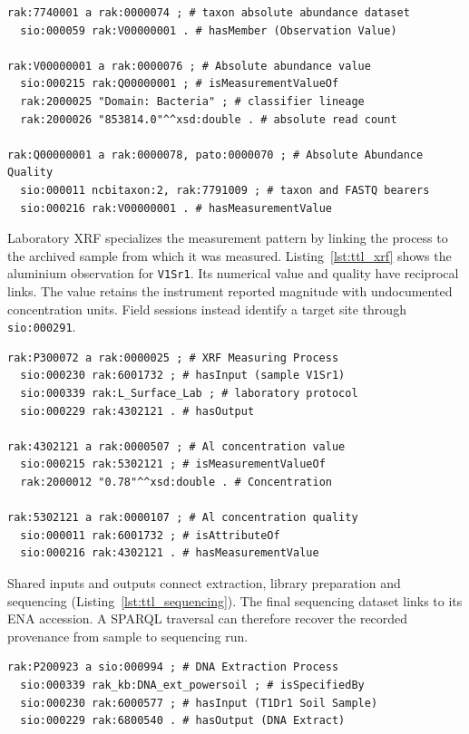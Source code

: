 \begin{revision}
\begin{lstlisting}[caption={Turtle representation of taxonomic abundance formalized from a feature table.}, label={lst:ttl_tax}, basicstyle=\ttfamily\scriptsize, frame=single]
rak:7740001 a rak:0000074 ; # taxon absolute abundance dataset
  sio:000059 rak:V00000001 . # hasMember (Observation Value)

rak:V00000001 a rak:0000076 ; # Absolute abundance value
  sio:000215 rak:Q00000001 ; # isMeasurementValueOf
  rak:2000025 "Domain: Bacteria" ; # classifier lineage
  rak:2000026 "853814.0"^^xsd:double . # absolute read count

rak:Q00000001 a rak:0000078, pato:0000070 ; # Absolute Abundance Quality
  sio:000011 ncbitaxon:2, rak:7791009 ; # taxon and FASTQ bearers
  sio:000216 rak:V00000001 . # hasMeasurementValue
\end{lstlisting}

Laboratory XRF specializes the measurement pattern by linking the
process to the archived sample from which it was measured. Listing~\ref{lst:ttl_xrf} shows the
aluminium observation for \texttt{V1Sr1}. Its numerical value and
quality have reciprocal links. The value retains the instrument reported
magnitude with undocumented concentration units. Field sessions instead
identify a target site through \texttt{sio:000291}.

\begin{lstlisting}[caption={Turtle representation of an XRF geochemistry measurement.}, label={lst:ttl_xrf}, basicstyle=\ttfamily\scriptsize, frame=single]
rak:P300072 a rak:0000025 ; # XRF Measuring Process
  sio:000230 rak:6001732 ; # hasInput (sample V1Sr1)
  sio:000339 rak:L_Surface_Lab ; # laboratory protocol
  sio:000229 rak:4302121 . # hasOutput

rak:4302121 a rak:0000507 ; # Al concentration value
  sio:000215 rak:5302121 ; # isMeasurementValueOf
  rak:2000012 "0.78"^^xsd:double . # Concentration

rak:5302121 a rak:0000107 ; # Al concentration quality
  sio:000011 rak:6001732 ; # isAttributeOf
  sio:000216 rak:4302121 . # hasMeasurementValue
\end{lstlisting}

Shared inputs and outputs connect extraction, library preparation and
sequencing (Listing~\ref{lst:ttl_sequencing}). The final sequencing
dataset links to its ENA accession. A SPARQL traversal can therefore
recover the recorded provenance from sample to sequencing run.

\begin{lstlisting}[caption={Turtle representation of the sequencing workflow from soil sample T1Dr1 to ENA run ERR16061083.}, label={lst:ttl_sequencing}, basicstyle=\ttfamily\scriptsize, frame=single]
rak:P200923 a sio:000994 ; # DNA Extraction Process
  sio:000339 rak_kb:DNA_ext_powersoil ; # isSpecifiedBy
  sio:000230 rak:6000577 ; # hasInput (T1Dr1 Soil Sample)
  sio:000229 rak:6800540 . # hasOutput (DNA Extract)


\end{lstlisting}
\end{revision}
